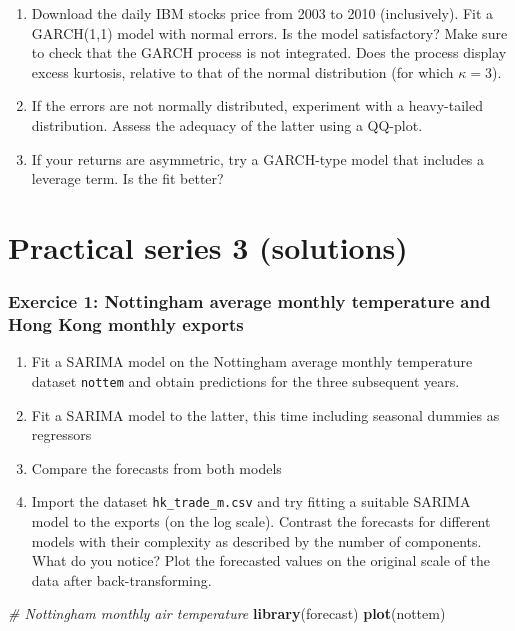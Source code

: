 \documentclass[]{book}
\newenvironment{Shaded}{\begin{snugshade}}{\end{snugshade}}
\newcommand{\KeywordTok}[1]{\textcolor[rgb]{0.13,0.29,0.53}{\textbf{#1}}}
\newcommand{\CommentTok}[1]{\textcolor[rgb]{0.56,0.35,0.01}{\textit{#1}}}
\newcommand{\NormalTok}[1]{#1}
\providecommand{\tightlist}{%
  \setlength{\itemsep}{0pt}\setlength{\parskip}{0pt}}
\begin{document}
\begin{enumerate}
\def\labelenumi{\arabic{enumi}.}
\tightlist
\item
  Download the daily IBM stocks price from 2003 to 2010 (inclusively).
  Fit a GARCH(1,1) model with normal errors. Is the model satisfactory?
  Make sure to check that the GARCH process is not integrated. Does the
  process display excess kurtosis, relative to that of the normal
  distribution (for which \(\kappa=3\)).
\item
  If the errors are not normally distributed, experiment with a
  heavy-tailed distribution. Assess the adequacy of the latter using a
  QQ-plot.
\item
  If your returns are asymmetric, try a GARCH-type model that includes a
  leverage term. Is the fit better?
\end{enumerate}

\chapter{Practical series 3
(solutions)}\label{practical-series-3-solutions}

\subsection{Exercice 1: Nottingham average monthly temperature and Hong
Kong monthly
exports}\label{exercice-1-nottingham-average-monthly-temperature-and-hong-kong-monthly-exports-1}

\begin{enumerate}
\def\labelenumi{\arabic{enumi}.}
\tightlist
\item
  Fit a SARIMA model on the Nottingham average monthly temperature
  dataset \texttt{nottem} and obtain predictions for the three
  subsequent years.
\item
  Fit a SARIMA model to the latter, this time including seasonal dummies
  as regressors
\item
  Compare the forecasts from both models
\item
  Import the dataset \texttt{hk\_trade\_m.csv} and try fitting a
  suitable SARIMA model to the exports (on the log scale). Contrast the
  forecasts for different models with their complexity as described by
  the number of components. What do you notice? Plot the forecasted
  values on the original scale of the data after back-transforming.
\end{enumerate}

\begin{Shaded}
\begin{Highlighting}[]
\CommentTok{# Nottingham monthly air temperature}
\KeywordTok{library}\NormalTok{(forecast)}
\KeywordTok{plot}\NormalTok{(nottem)}
\end{Highlighting}
\end{Shaded}
\end{document}

